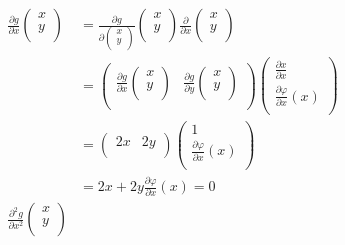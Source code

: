\documentclass[dvipdfmx]{jsarticle}
\begin{document}
\begin{align*}
\frac{\partial g}{\partial x}\begin{pmatrix}
x \\
y \\
\end{pmatrix} &= \frac{\partial g}{\partial\begin{pmatrix}
x \\
y \\
\end{pmatrix}}\begin{pmatrix}
x \\
y \\
\end{pmatrix}\frac{\partial}{\partial x}\begin{pmatrix}
x \\
y \\
\end{pmatrix}\\
&= \begin{pmatrix}
\frac{\partial g}{\partial x}\begin{pmatrix}
x \\
y \\
\end{pmatrix} & \frac{\partial g}{\partial y}\begin{pmatrix}
x \\
y \\
\end{pmatrix} \\
\end{pmatrix}\begin{pmatrix}
\frac{\partial x}{\partial x} \\
\frac{\partial\varphi}{\partial x}(x) \\
\end{pmatrix}\\
&= \begin{pmatrix}
2x & 2y \\
\end{pmatrix}\begin{pmatrix}
1 \\
\frac{\partial\varphi}{\partial x}(x) \\
\end{pmatrix}\\
&= 2x + 2y\frac{\partial\varphi}{\partial x}(x) = 0\\
\frac{\partial^{2}g}{\partial x^{2}}\begin{pmatrix}
x \\
y \\

\end{pmatrix}
\end{align*}
\end{document}
